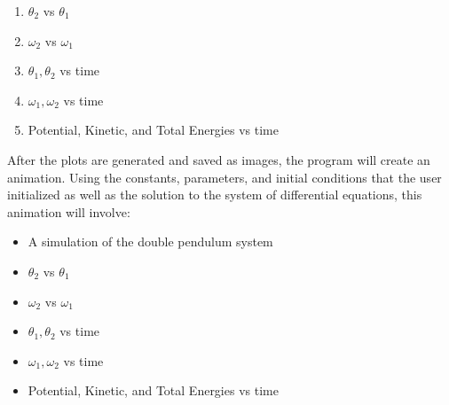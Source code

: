 \begin{enumerate}
    \item $\theta_2$ vs $\theta_1$
    \item $\omega_2$ vs $\omega_1$
    \item $\theta_1, \theta_2$ vs time
    \item $\omega_1, \omega_2$ vs time
    \item Potential, Kinetic, and Total Energies vs time
\end{enumerate}

After the plots are generated and saved as images, the program will create an animation. Using the constants, parameters, and initial conditions that the user initialized as well as the solution to the system of differential equations, this animation will involve:

\begin{itemize}
    \item A simulation of the double pendulum system
    \item $\theta_2$ vs $\theta_1$
    \item $\omega_2$ vs $\omega_1$
    \item $\theta_1, \theta_2$ vs time
    \item $\omega_1, \omega_2$ vs time
    \item Potential, Kinetic, and Total Energies vs time
\end{itemize}
